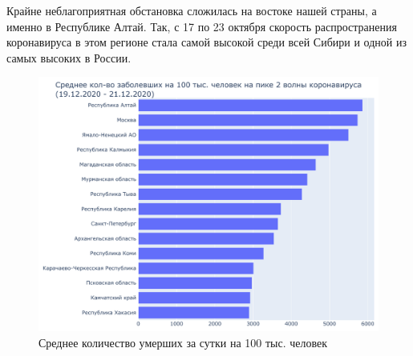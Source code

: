 \documentclass[a4paper, 12pt]{extarticle}
\begin{document}
Крайне неблагоприятная обстановка сложилась на востоке нашей страны, а именно в Республике Алтай. Так, с 17 по 23 октября скорость распространения коронавируса в этом регионе стала самой высокой среди всей Сибири и одной из самых высоких в России.
\\

\newpage

\begin{figure}[h]
    \centering
    \includegraphics[scale=0.6]{../plots/6total_confirmed_per_100k_bar_plot_2wave.pdf}
    \caption{Среднее количество умерших за сутки на 100 тыс. человек}
    \label{fig:average_deaths_per_100k_2wave}
\end{figure}

{}

\end{document}
